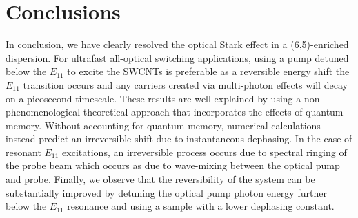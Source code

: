 \section{Conclusions}

In conclusion, we have clearly resolved the optical Stark effect in a (6,5)-enriched dispersion. For ultrafast all-optical switching applications, using a pump detuned below the $E_{11}$ to excite the SWCNTs is preferable as a reversible energy shift the $E_{11}$ transition occurs and any carriers created via multi-photon effects will decay on a picosecond timescale. These results are well explained by using a non-phenomenological theoretical approach that incorporates the effects of quantum memory. Without accounting for quantum memory, numerical calculations instead predict an irreversible shift due to instantaneous dephasing. In the case of resonant $E_{11}$ excitations, an irreversible process occurs due to spectral ringing of the probe beam which occurs as due to wave-mixing between the optical pump and probe. Finally, we observe that the reversibility of the system can be substantially improved by detuning the optical pump photon energy further below the $E_{11}$ resonance and using a sample with a lower dephasing constant.

